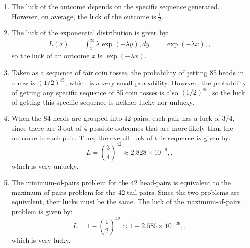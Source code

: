 \begin{enumerate}
\item The luck of the outcome depends on the specific sequence generated. However, on average, the luck of the outcome is $\frac{1}{2}$.

\item The luck of the exponential distribution is given by:
\begin{align*}
L(x) &= \int_x^\infty \lambda \exp(-\lambda y) , dy \
&= \exp(-\lambda x) ,,
\end{align*}
so the luck of an outcome $x$ is $\exp(-\lambda x)$.

\item Taken as a sequence of fair coin tosses, the probability of getting 85 heads in a row is $(1/2)^{85}$, which is a very small probability. However, the probability of getting any specific sequence of 85 coin tosses is also $(1/2)^{85}$, so the luck of getting this specific sequence is neither lucky nor unlucky.

\item When the 84 heads are grouped into 42 pairs, each pair has a luck of $3/4$, since there are 3 out of 4 possible outcomes that are more likely than the outcome in each pair. Thus, the overall luck of this sequence is given by:
\begin{equation*}
L = \left( \frac{3}{4} \right)^{42} \approx 2.828 \times 10^{-6} ,,
\end{equation*}
which is very unlucky.

\item The minimum-of-pairs problem for the 42 head-pairs is equivalent to the maximum-of-pairs problem for the 42 tail-pairs. Since the two problems are equivalent, their lucks must be the same. The luck of the maximum-of-pairs problem is given by:
\begin{equation*}
L = 1 - \left( \frac{1}{2} \right)^{42} \approx 1 - 2.585 \times 10^{-26} ,,
\end{equation*}
which is very lucky.
\end{enumerate}

